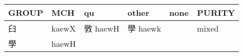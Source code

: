 \documentclass[14pt,a4paper]{scrartcl}
\begin{document}
\begin{longtable}[c]{@{}llllll@{}}
\toprule
\begin{minipage}[b]{0.14\columnwidth}\raggedright\strut
GROUP
\strut\end{minipage} &
\begin{minipage}[b]{0.14\columnwidth}\raggedright\strut
MCH
\strut\end{minipage} &
\begin{minipage}[b]{0.14\columnwidth}\raggedright\strut
qu
\strut\end{minipage} &
\begin{minipage}[b]{0.14\columnwidth}\raggedright\strut
other
\strut\end{minipage} &
\begin{minipage}[b]{0.14\columnwidth}\raggedright\strut
none
\strut\end{minipage} &
\begin{minipage}[b]{0.14\columnwidth}\raggedright\strut
PURITY
\strut\end{minipage}\tabularnewline
\midrule
\endhead
\begin{minipage}[t]{0.14\columnwidth}\raggedright\strut
𦥑
\strut\end{minipage} &
\begin{minipage}[t]{0.14\columnwidth}\raggedright\strut
kaewX
\strut\end{minipage} &
\begin{minipage}[t]{0.14\columnwidth}\raggedright\strut
斆 haewH
\strut\end{minipage} &
\begin{minipage}[t]{0.14\columnwidth}\raggedright\strut
學 haewk
\strut\end{minipage} &
\begin{minipage}[t]{0.14\columnwidth}\raggedright\strut
\strut\end{minipage} &
\begin{minipage}[t]{0.14\columnwidth}\raggedright\strut
mixed
\strut\end{minipage}\tabularnewline
\begin{minipage}[t]{0.14\columnwidth}\raggedright\strut
學
\strut\end{minipage} &
\begin{minipage}[t]{0.14\columnwidth}\raggedright\strut
haewH
\strut\end{minipage} &
\begin{minipage}[t]{0.14\columnwidth}\raggedright\strut
\strut\end{minipage} &
\begin{minipage}[t]{0.14\columnwidth}\raggedright\strut

\end{minipage}
\end{longtable}
\end{document}
